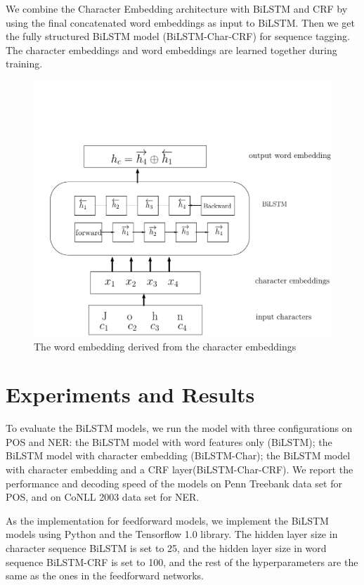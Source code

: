 \documentclass{sfuthesis}
\begin{document}
We combine the Character Embedding architecture with BiLSTM and CRF by using the final concatenated word embeddings as input to BiLSTM. Then we get the fully structured BiLSTM model (BiLSTM-Char-CRF) for sequence tagging. The character embeddings and word embeddings are learned together during training.

\begin{figure}
  \centering
  \includegraphics[scale=0.5]{bilstmchar.pdf}
 \caption{The word embedding derived from the character embeddings}
  \label{fig:charlstm}
\end{figure}


 
\section{Experiments and Results}

To evaluate the BiLSTM models, we run the model with three configurations on POS and NER: the BiLSTM model with word features only (BiLSTM); the BiLSTM model with character embedding (BiLSTM-Char); the BiLSTM model with character embedding and a CRF layer(BiLSTM-Char-CRF). We report the performance and decoding speed of the models on Penn Treebank data set for POS, and on CoNLL 2003 data set for NER. 

As the implementation for feedforward models, we implement the BiLSTM models using Python and the Tensorflow 1.0 library. The hidden layer size in character sequence BiLSTM is set to 25, and the hidden layer size in word sequence BiLSTM-CRF is set to 100, and the rest of the hyperparameters are the same as the ones in the feedforward networks.
\end{document}
